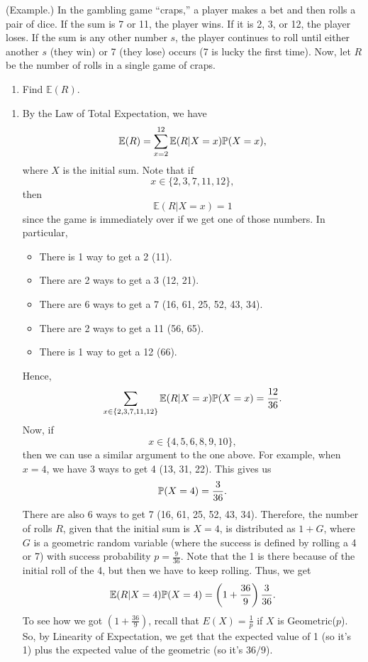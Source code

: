\documentclass[letterpaper]{article}
\begin{document}
\begin{mdframed}[]
    (Example.) In the gambling game ``craps,'' a player makes a bet and then rolls a pair of dice. If the sum is 7 or 11, the player wins. If it is 2, 3, or 12, the player loses. If the sum is any other number $s$, the player continues to roll until either another $s$ (they win) or 7 (they lose) occurs (7 is lucky the first time). Now, let $R$ be the number of rolls in a single game of craps.
    \begin{enumerate}
        \item Find $\mathbb{E}(R)$. 
    \end{enumerate}

    \begin{mdframed}[]
        \begin{enumerate}
            \item By the Law of Total Expectation, we have 
            \[\mathbb{E}(R) = \sum_{x = 2}^{12} \mathbb{E}(R | X = x)\mathbb{P}(X = x),\]
            where $X$ is the initial sum. Note that if 
            \[x \in \{2, 3, 7, 11, 12\},\]
            then \[\mathbb{E}(R | X = x) = 1\]
            since the game is immediately over if we get one of those numbers. In particular,
            \begin{itemize}
                \item There is 1 way to get a 2 (11).
                \item There are 2 ways to get a 3 (12, 21).
                \item There are 6 ways to get a 7 (16, 61, 25, 52, 43, 34).
                \item There are 2 ways to get a 11 (56, 65).
                \item There is 1 way to get a 12 (66).
            \end{itemize}
            Hence, 
            \[\sum_{x \in \{2, 3, 7, 11, 12\}} \mathbb{E}(R | X = x) \mathbb{P}(X = x) = \frac{12}{36}.\]
            Now, if \[x \in \{4, 5, 6, 8, 9, 10\},\] then we can use a similar argument to the one above. For example, when $x = 4$, we have 3 ways to get 4 (13, 31, 22). This gives us \[\mathbb{P}(X = 4) = \frac{3}{36}.\] There are also 6 ways to get 7 (16, 61, 25, 52, 43, 34). Therefore, the number of rolls $R$, given that the initial sum is $X = 4$, is distributed as $1 + G$, where $G$ is a geometric random variable (where the success is defined by rolling a 4 or 7) with success probability $p = \frac{9}{36}$. Note that the 1 is there because of the initial roll of the 4, but then we have to keep rolling. Thus, we get  
            \[\mathbb{E}(R | X = 4)\mathbb{P}(X = 4) = \left(1 + \frac{36}{9}\right) \frac{3}{36}.\]
            To see how we got $\left(1 + \frac{36}{9}\right)$, recall that $E(X) = \frac{1}{p}$ if $X$ is Geometric($p$). So, by Linearity of Expectation, we get that the expected value of 1 (so it's 1) plus the expected value of the geometric (so it's $36 / 9$).


\end{enumerate}
\end{mdframed}
\end{mdframed}
\end{document}
